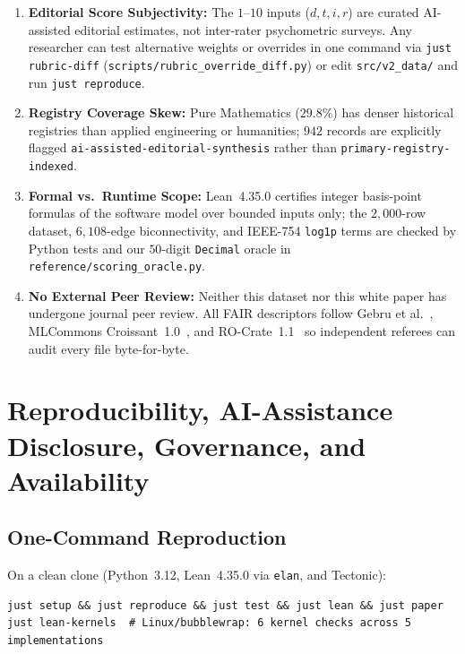 \documentclass[11pt,reqno]{amsart}
\theoremstyle{plain}
\theoremstyle{definition}
\newcommand{\code}[1]{{\footnotesize\nolinkurl{#1}}}
\begin{document}
\begin{enumerate}[leftmargin=1.5em,noitemsep,topsep=1pt]
  \item \textbf{Editorial Score Subjectivity:} The $1$--$10$ inputs ($d, t, i, r$) are curated AI-assisted editorial estimates, not inter-rater psychometric surveys. Any researcher can test alternative weights or overrides in one command via \code{just rubric-diff} (\code{scripts/rubric_override_diff.py}) or edit \code{src/v2_data/} and run \code{just reproduce}.
  \item \textbf{Registry Coverage Skew:} Pure Mathematics ($29.8\%$) has denser historical registries than applied engineering or humanities; $942$ records are explicitly flagged \code{ai-assisted-editorial-synthesis} rather than \code{primary-registry-indexed}.
  \item \textbf{Formal vs.\ Runtime Scope:} Lean~4.35.0 certifies integer basis-point formulas of the software model over bounded inputs only; the $2{,}000$-row dataset, $6{,}108$-edge biconnectivity, and IEEE-754 \code{log1p} terms are checked by Python tests and our $50$-digit \code{Decimal} oracle in \code{reference/scoring_oracle.py}.
  \item \textbf{No External Peer Review:} Neither this dataset nor this white paper has undergone journal peer review. All FAIR descriptors follow Gebru et al.~\cite{gebru2021datasheets}, MLCommons Croissant~1.0~\cite{akhtar2024croissant}, and RO-Crate~1.1~\cite{soilandreyes2022rocrate} so independent referees can audit every file byte-for-byte.
\end{enumerate}

\section{Reproducibility, AI-Assistance Disclosure, Governance, and Availability}
\label{sec:repro}

\subsection{One-Command Reproduction}
On a clean clone (Python~3.12, Lean~4.35.0 via \code{elan}, and Tectonic):

\vspace{2pt}
\noindent\begin{minipage}{\textwidth}\small
\begin{verbatim}
just setup && just reproduce && just test && just lean && just paper
just lean-kernels  # Linux/bubblewrap: 6 kernel checks across 5 implementations
\end{verbatim}
\end{minipage}
\vspace{2pt}
\end{document}
